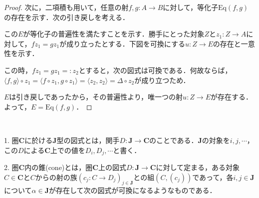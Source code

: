\documentclass[uplatex, 12pt, dvipdfmx]{jsarticle}
\begin{document}
\begin{proof}
    次に，二項積も用いて，任意の射$f,g:A\to B$に対して，等化子$\mathrm{Eq}(f,g)$の存在を示す．次の引き戻しを考える．
    \begin{center}
    \end{center}
    この$E$が等化子の普遍性を満たすことを示す．勝手にとった対象$Z$と$z_1:Z\to A$に対して，$fz_1=gz_1$が成り立ったとする．下図を可換にする$u:Z\to E$の存在と一意性を示す．
    \begin{center}
    \end{center}
    この時，$fz_1=gz_1=:z_2$とすると，次の図式は可換である．何故ならば，$\langle f,g\rangle\circ z_1 = \langle f\circ z_1,g\circ z_1\rangle=\langle z_2,z_2\rangle =\Delta\circ z_2$が成り立つため．
    \begin{center}
    \end{center}
    $E$は引き戻しであったから，その普遍性より，唯一つの射$u:Z\to E$が存在する．よって，$E=\mathrm{Eq}(f,g)$．
\end{proof}

\vspace{3cm}

\begin{definition}[図式，錐]　

    1. 圏$\mathbf{C}$に於ける$\mathbf{J}$型の図式とは，関手$D:\mathbf{J}\to \mathbf{C}$のことである．$\mathbf{J}$の対象を$i,j,\cdots$，この$D$による$\mathbf{C}$上での値を$D_i,D_j,\cdots$と書く．

    2. 圏$\mathbf{C}$内の錐(cone)とは，圏$\mathbf{C}$上の図式$D:\mathbf{J}\to\mathbf{C}$に対して定まる，ある対象$C\in\mathbf{C}$と$C$からの射の族$(c_j:C\to D_j)_{j\in\mathbf{J}}$との組$(C,(c_j))$であって，各$i,j\in\mathbf{J}$について$\alpha\in\mathbf{J}$が存在して次の図式が可換になるようなものである．
    \begin{center}
    \end{center}
\end{definition}
\end{document}
